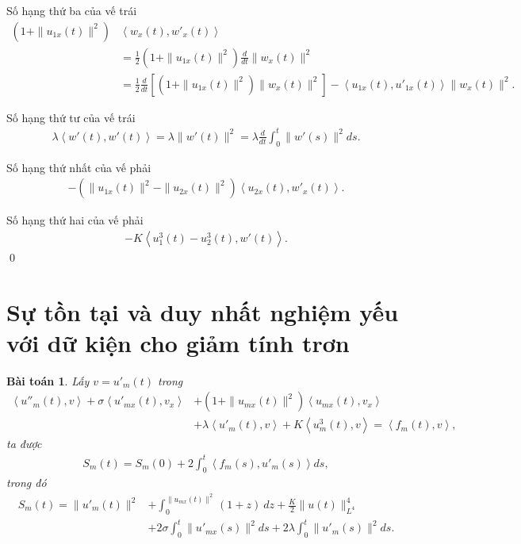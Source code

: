 \documentclass[12pt,a4paper]{article}
\newtheorem{theorem}{Bài toán}[section]
\theoremstyle{definition}
\begin{document}
Số hạng thứ ba của vế trái
\begin{align*}
    \left(1 + \|u_{1x}(t)\|^2\right) &\left<w_x(t),w'_x(t)\right> \\
    &= \frac{1}{2} \left(1 + \|u_{1x}(t)\|^2\right) \frac{d}{dt} \|w_x(t)\|^2 \\
    &= \frac{1}{2} \frac{d}{dt} \left[ \left(1 + \|u_{1x}(t)\|^2 \right) \|w_x(t)\|^2 \right] - \left<u_{1x}(t),u'_{1x}(t)\right> \|w_x(t)\|^2.
\end{align*}

Số hạng thứ tư của vế trái
\begin{align*}
    \lambda \left<w'(t),w'(t)\right> = \lambda \|w'(t)\|^2 = \lambda \frac{d}{dt} \int_0^t \|w'(s)\|^2 ds.
\end{align*}

Số hạng thứ nhất của vế phải
\begin{align*}
    -\left(\|u_{1x}(t)\|^2 - \|u_{2x}(t)\|^2\right) \left<u_{2x}(t),w'_x(t)\right>.
\end{align*}

Số hạng thứ hai của vế phải
\begin{align*}
    -K \left<u^3_1(t) - u^3_2(t),w'(t)\right>.
\end{align*} \qed

\section{Sự tồn tại và duy nhất nghiệm yếu với dữ kiện cho giảm tính trơn}

\begin{theorem}
    Lấy $v = u'_m(t)$ trong
    \begin{align*}
        \left<u''_m(t), v\right>
        + \sigma \left<u'_{mx}(t),v_x\right>
        &+ \left(1 + \|u_{mx}(t)\|^2\right) \left<u_{mx}(t),v_x\right> \\
        &+ \lambda \left<u'_m(t),v\right>
        + K \left<u^3_m(t),v\right>
        = \left<f_m(t),v\right>,
    \end{align*}
    ta được
    \begin{align*}
        S_m(t) = S_m(0) + 2 \int_0^t \left<f_m(s),u'_m(s)\right>ds,
    \end{align*}
    trong đó
    \begin{align*}
        S_m(t) = \|u'_m(t)\|^2
        &+ \int_0^{\|u_{mx}(t)\|^2} (1+z)\:dz
        + \frac{K}{2}\|u(t)\|^4_{L^4} \\
        &+ 2\sigma \int_0^t \|u'_{mx}(s)\|^2 ds
        + 2\lambda \int_0^t \|u'_m(s)\|^2 ds.
    \end{align*}
\end{theorem}
\end{document}
